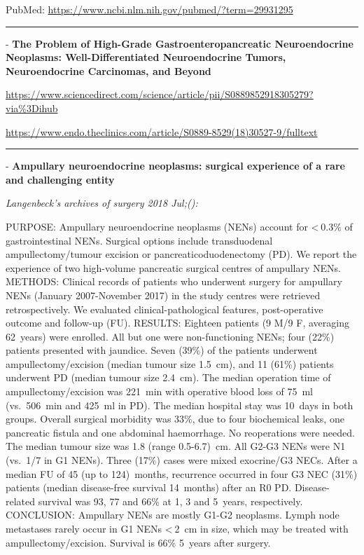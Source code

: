 \documentclass[]{article}
\begin{document}
PubMed: \url{https://www.ncbi.nlm.nih.gov/pubmed/?term=29931295}

{}

{}

\begin{center}\rule{0.5\linewidth}{\linethickness}\end{center}

 - \textbf{The Problem of High-Grade Gastroenteropancreatic
Neuroendocrine Neoplasms: Well-Differentiated Neuroendocrine Tumors,
Neuroendocrine Carcinomas, and Beyond}

\url{https://www.sciencedirect.com/science/article/pii/S0889852918305279?via\%3Dihub}

\url{https://www.endo.theclinics.com/article/S0889-8529(18)30527-9/fulltext}

\begin{center}\rule{0.5\linewidth}{\linethickness}\end{center}

 - \textbf{Ampullary neuroendocrine neoplasms: surgical experience of a
rare and challenging entity}

\emph{Langenbeck's archives of surgery 2018 Jul;():}

PURPOSE: Ampullary neuroendocrine neoplasms (NENs) account for
\textless{} 0.3\% of gastrointestinal NENs. Surgical options include
transduodenal ampullectomy/tumour excision or pancreaticoduodenectomy
(PD). We report the experience of two high-volume pancreatic surgical
centres of ampullary NENs. METHODS: Clinical records of patients who
underwent surgery for ampullary NENs (January 2007-November 2017) in the
study centres were retrieved retrospectively. We evaluated
clinical-pathological features, post-operative outcome and follow-up
(FU). RESULTS: Eighteen patients (9 M/9 F, averaging 62~years) were
enrolled. All but one were non-functioning NENs; four (22\%) patients
presented with jaundice. Seven (39\%) of the patients underwent
ampullectomy/excision (median tumour size 1.5~cm), and 11 (61\%)
patients underwent PD (median tumour size 2.4~cm). The median operation
time of ampullectomy/excision was 221~min with operative blood loss of
75~ml (vs.~506~min and 425~ml in PD). The median hospital stay was
10~days in both groups. Overall surgical morbidity was 33\%, due to four
biochemical leaks, one pancreatic fistula and one abdominal haemorrhage.
No reoperations were needed. The median tumour size was 1.8 (range
0.5-6.7)~cm. All G2-G3 NENs were N1 (vs.~1/7 in G1 NENs). Three (17\%)
cases were mixed exocrine/G3 NECs. After a median FU of 45 (up to
124)~months, recurrence occurred in four G3 NEC (31\%) patients (median
disease-free survival 14~months) after an R0 PD. Disease-related
survival was 93, 77 and 66\% at 1, 3 and 5~years, respectively.
CONCLUSION: Ampullary NENs are mostly G1-G2 neoplasms. Lymph node
metastases rarely occur in G1 NENs \textless{} 2~cm in size, which may
be treated with ampullectomy/excision. Survival is 66\% 5~years after
surgery.
\end{document}

